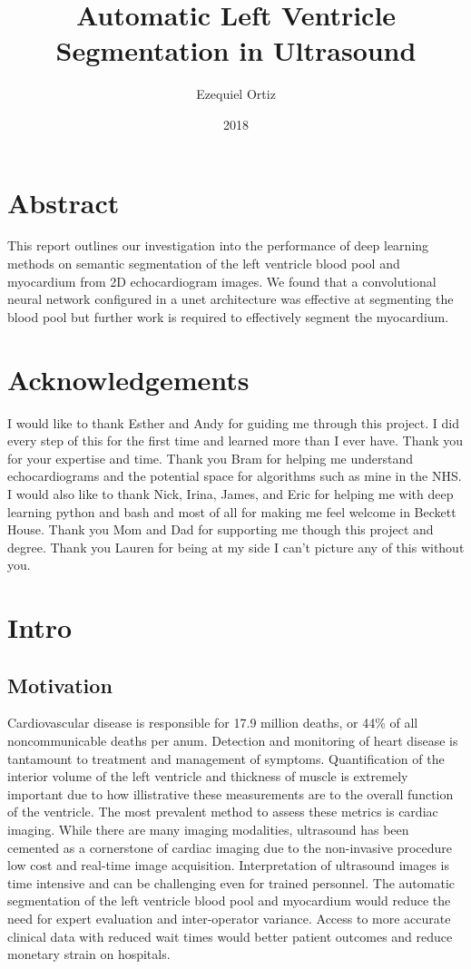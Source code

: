 \documentclass[12pt]{article}
\title{Automatic Left Ventricle Segmentation in Ultrasound}
\date{2018}
\author{Ezequiel Ortiz}
\begin{document}
\maketitle
{}
\newpage
\tableofcontents
\newpage
\doublespacing
{}

\section{Abstract}
This report outlines our investigation into the performance of deep learning methods on semantic segmentation of the left ventricle blood pool and myocardium from 2D echocardiogram images.
We found that a convolutional neural network configured in a unet architecture was effective at segmenting the blood pool but further work is required to effectively segment the myocardium.

\section{Acknowledgements}
I would like to thank Esther and Andy for guiding me through this project.
I did every step of this for the first time and learned more than I ever have.
Thank you for your expertise and time.
Thank you Bram for helping me understand echocardiograms and the potential space for algorithms such as mine in the NHS.
I would also like to thank Nick, Irina, James, and Eric for helping me with deep learning python and bash and most of all for making me feel welcome in Beckett House.
Thank you Mom and Dad for supporting me though this project and degree.
Thank you Lauren for being at my side I can't picture any of this without you.

\section{Intro}
\subsection{Motivation}
Cardiovascular disease is responsible for 17.9 million deaths, or 44\% of all noncommunicable deaths per anum\cite{who_world_health}.
Detection and monitoring of heart disease is tantamount to treatment and management of symptoms.%
Quantification of the interior volume of the left ventricle and thickness of muscle is extremely important due to how illistrative these measurements are to the overall function of the ventricle.\cite{ase_chamber_quant}
The most prevalent method to assess these metrics is cardiac imaging.
While there are many imaging modalities, ultrasound has been cemented as a cornerstone of cardiac imaging due to the non-invasive procedure low cost and real-time image acquisition.
Interpretation of ultrasound images is time intensive and can be challenging even for trained personnel.
The automatic segmentation of the left ventricle blood pool and myocardium
would reduce the need for expert evaluation and inter-operator variance.%
Access to more accurate clinical data with reduced wait times would better patient outcomes and reduce monetary strain on hospitals.
\end{document}
